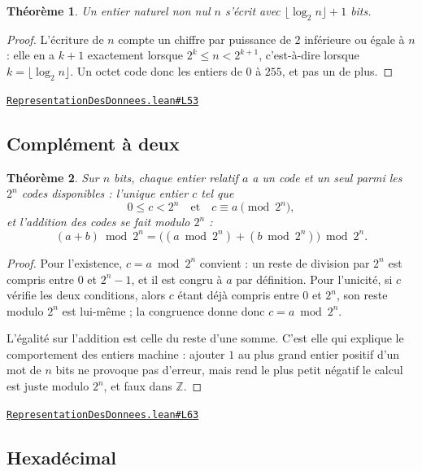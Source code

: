 \documentclass[11pt,a4paper]{article}
\theoremstyle{definition}
\theoremstyle{plain}
\newtheorem{theoreme}{Théorème}
\newcommand{\source}[2]{\par\smallskip\noindent\hfill{\footnotesize\href{#1}{\texttt{#2}}}\par\smallskip}
\begin{document}
\begin{theoreme}
Un entier naturel non nul $n$ s'écrit avec $\lfloor \log_2 n \rfloor + 1$ bits.
\end{theoreme}
\begin{proof}
L'écriture de $n$ compte un chiffre par puissance de $2$ inférieure ou égale à $n$ :
elle en a $k+1$ exactement lorsque $2^k \le n < 2^{k+1}$, c'est-à-dire lorsque
$k = \lfloor \log_2 n \rfloor$. Un octet code donc les entiers de $0$ à $255$, et pas un
de plus.
\end{proof}
\source{https://github.com/Commutator-IO/learn-lean/blob/main/courses/02-lycee/11-informatique-nsi/RepresentationDesDonnees.lean\#L53}{RepresentationDesDonnees.lean\#L53}

\subsection{Complément à deux}

\begin{theoreme}
Sur $n$ bits, chaque entier relatif $a$ a un code et un seul parmi les $2^n$ codes
disponibles : l'unique entier $c$ tel que
\[ 0 \le c < 2^n \quad \text{et} \quad c \equiv a \pmod{2^n} , \]
et l'addition des codes se fait modulo $2^n$ :
\[ (a + b) \bmod 2^n = \bigl((a \bmod 2^n) + (b \bmod 2^n)\bigr) \bmod 2^n . \]
\end{theoreme}
\begin{proof}
Pour l'existence, $c = a \bmod 2^n$ convient : un reste de division par $2^n$ est compris
entre $0$ et $2^n - 1$, et il est congru à $a$ par définition. Pour l'unicité, si $c$
vérifie les deux conditions, alors $c$ étant déjà compris entre $0$ et $2^n$, son reste
modulo $2^n$ est lui-même ; la congruence donne donc $c = a \bmod 2^n$.

L'égalité sur l'addition est celle du reste d'une somme. C'est elle qui explique le
comportement des entiers machine : ajouter $1$ au plus grand entier positif d'un mot de
$n$ bits ne provoque pas d'erreur, mais rend le plus petit négatif \textemdash{} le calcul
est juste modulo $2^n$, et faux dans $\mathbb{Z}$.
\end{proof}
\source{https://github.com/Commutator-IO/learn-lean/blob/main/courses/02-lycee/11-informatique-nsi/RepresentationDesDonnees.lean\#L63}{RepresentationDesDonnees.lean\#L63}

\subsection{Hexadécimal}
\end{document}

